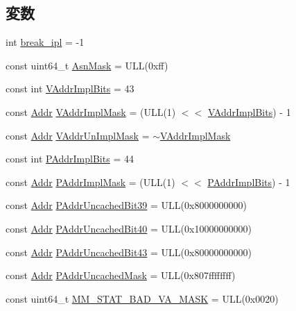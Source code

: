 \subsection*{変数}
\begin{DoxyCompactItemize}
\item 
int \hyperlink{namespaceAlphaISA_a21fbc55471b0f0ca756a8ff20c86926a}{break\_\-ipl} = -\/1
\item 
const uint64\_\-t \hyperlink{namespaceAlphaISA_ab71cf3e85f86b7f2ed5572f2c4c04129}{AsnMask} = ULL(0xff)
\item 
const int \hyperlink{namespaceAlphaISA_a5ce0fab4a9e923e190218b6d12207a9d}{VAddrImplBits} = 43
\item 
const \hyperlink{classm5_1_1params_1_1Addr}{Addr} \hyperlink{namespaceAlphaISA_a3d31b41fa4d20dbbd91b61d7df201ac9}{VAddrImplMask} = (ULL(1) $<$$<$ \hyperlink{namespaceAlphaISA_a5ce0fab4a9e923e190218b6d12207a9d}{VAddrImplBits}) -\/ 1
\item 
const \hyperlink{classm5_1_1params_1_1Addr}{Addr} \hyperlink{namespaceAlphaISA_abf1ec857b893186376e563b0da26ec1b}{VAddrUnImplMask} = $\sim$\hyperlink{namespaceAlphaISA_a3d31b41fa4d20dbbd91b61d7df201ac9}{VAddrImplMask}
\item 
const int \hyperlink{namespaceAlphaISA_a524d6a2c6c70550904ff8fbcd015d6ec}{PAddrImplBits} = 44
\item 
const \hyperlink{classm5_1_1params_1_1Addr}{Addr} \hyperlink{namespaceAlphaISA_abb8b7685b079953e35015543262458e2}{PAddrImplMask} = (ULL(1) $<$$<$ \hyperlink{namespaceAlphaISA_a524d6a2c6c70550904ff8fbcd015d6ec}{PAddrImplBits}) -\/ 1
\item 
const \hyperlink{classm5_1_1params_1_1Addr}{Addr} \hyperlink{namespaceAlphaISA_ac10235dc75b856834b31439d8e250374}{PAddrUncachedBit39} = ULL(0x8000000000)
\item 
const \hyperlink{classm5_1_1params_1_1Addr}{Addr} \hyperlink{namespaceAlphaISA_a49418c464b9c2fec6cdcbd0bc558d14c}{PAddrUncachedBit40} = ULL(0x10000000000)
\item 
const \hyperlink{classm5_1_1params_1_1Addr}{Addr} \hyperlink{namespaceAlphaISA_ac252afca5e58f1a1873328793f69804c}{PAddrUncachedBit43} = ULL(0x80000000000)
\item 
const \hyperlink{classm5_1_1params_1_1Addr}{Addr} \hyperlink{namespaceAlphaISA_a0560c6f813b1ab48a8790c503feb1158}{PAddrUncachedMask} = ULL(0x807ffffffff)
\item 
const uint64\_\-t \hyperlink{namespaceAlphaISA_a4b5e389d1116e4dbfd4d9c3e918d87cf}{MM\_\-STAT\_\-BAD\_\-VA\_\-MASK} = ULL(0x0020)

\end{DoxyCompactItemize}
